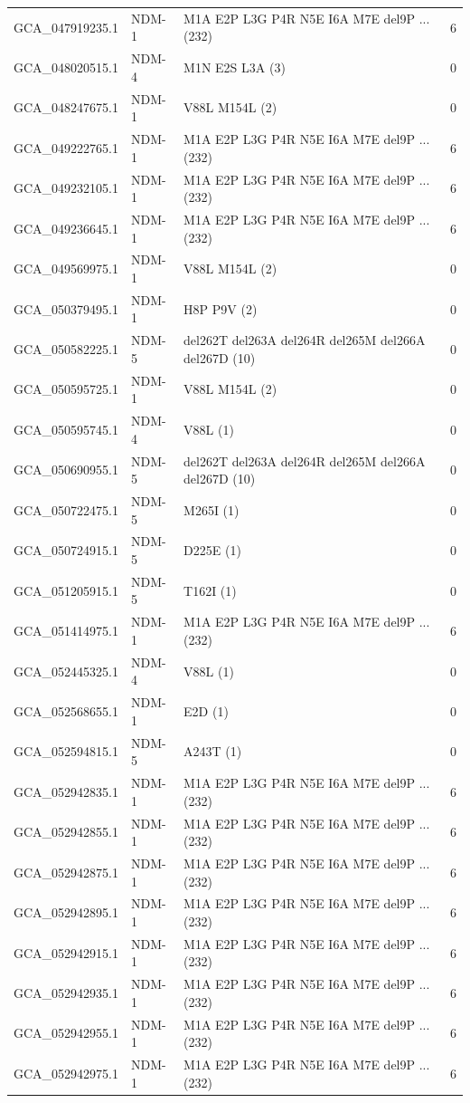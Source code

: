 \begin{longtable}{llll}
GCA\_047919235.1&NDM-1&M1A E2P L3G P4R N5E I6A M7E del9P ... (232)&6\\
GCA\_048020515.1&NDM-4&M1N E2S L3A (3)&0\\
GCA\_048247675.1&NDM-1&V88L M154L (2)&0\\
GCA\_049222765.1&NDM-1&M1A E2P L3G P4R N5E I6A M7E del9P ... (232)&6\\
GCA\_049232105.1&NDM-1&M1A E2P L3G P4R N5E I6A M7E del9P ... (232)&6\\
GCA\_049236645.1&NDM-1&M1A E2P L3G P4R N5E I6A M7E del9P ... (232)&6\\
GCA\_049569975.1&NDM-1&V88L M154L (2)&0\\
GCA\_050379495.1&NDM-1&H8P P9V (2)&0\\
GCA\_050582225.1&NDM-5&del262T del263A del264R del265M del266A del267D  (10)&0\\
GCA\_050595725.1&NDM-1&V88L M154L (2)&0\\
GCA\_050595745.1&NDM-4&V88L (1)&0\\
GCA\_050690955.1&NDM-5&del262T del263A del264R del265M del266A del267D  (10)&0\\
GCA\_050722475.1&NDM-5&M265I (1)&0\\
GCA\_050724915.1&NDM-5&D225E (1)&0\\
GCA\_051205915.1&NDM-5&T162I (1)&0\\
GCA\_051414975.1&NDM-1&M1A E2P L3G P4R N5E I6A M7E del9P ... (232)&6\\
GCA\_052445325.1&NDM-4&V88L (1)&0\\
GCA\_052568655.1&NDM-1&E2D (1)&0\\
GCA\_052594815.1&NDM-5&A243T (1)&0\\
GCA\_052942835.1&NDM-1&M1A E2P L3G P4R N5E I6A M7E del9P ... (232)&6\\
GCA\_052942855.1&NDM-1&M1A E2P L3G P4R N5E I6A M7E del9P ... (232)&6\\
GCA\_052942875.1&NDM-1&M1A E2P L3G P4R N5E I6A M7E del9P ... (232)&6\\
GCA\_052942895.1&NDM-1&M1A E2P L3G P4R N5E I6A M7E del9P ... (232)&6\\
GCA\_052942915.1&NDM-1&M1A E2P L3G P4R N5E I6A M7E del9P ... (232)&6\\
GCA\_052942935.1&NDM-1&M1A E2P L3G P4R N5E I6A M7E del9P ... (232)&6\\
GCA\_052942955.1&NDM-1&M1A E2P L3G P4R N5E I6A M7E del9P ... (232)&6\\
GCA\_052942975.1&NDM-1&M1A E2P L3G P4R N5E I6A M7E del9P ... (232)&6\\

\end{longtable}
